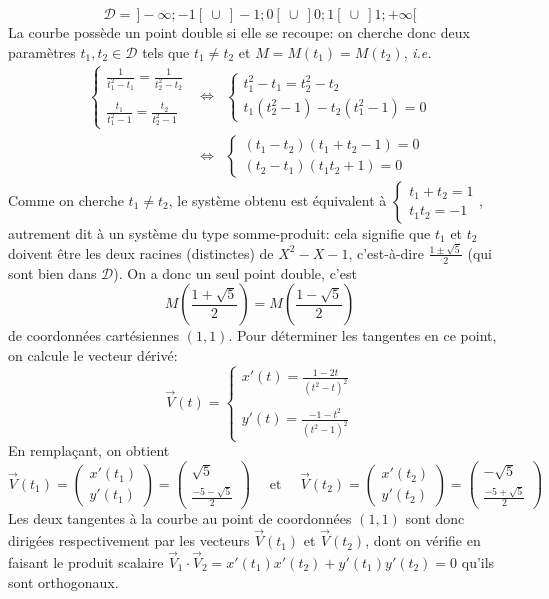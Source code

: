{{$$\mathcal{D}=\,]-\infty;-1[\ \cup\ ]-1;0[\ \cup\ ]0;1[\ \cup\ ]1;+\infty[$$
La courbe possède un point double si elle se recoupe: on cherche donc deux paramètres $t_1,t_2\in\mathcal{D}$ tels que $t_1\not=t_2$ et $M=M(t_1)=M(t_2)$, \textsl{i.e.}
\begin{eqnarray*}
\left\{\begin{array}{l}
\frac{1}{t_1^2-t_1}=\frac{1}{t_2^2-t_2}\\
\ \\
\frac{t_1}{t_1^2-1}=\frac{t_2}{t_2^2-1}
\end{array}\right.
&\Longleftrightarrow&\left\{\begin{array}{l}
t_1^2-t_1=t_2^2-t_2\\
t_1(t_2^2-1)-t_2(t_1^2-1)=0
\end{array}\right.\\
 &\Longleftrightarrow&\left\{\begin{array}{l}
(t_1-t_2)(t_1+t_2-1)=0\\
(t_2-t_1)(t_1t_2+1)=0
\end{array}\right.
\end{eqnarray*}
Comme on cherche $t_1\not=t_2$, le système obtenu est équivalent à 
$\displaystyle\left\{\begin{array}{l}t_1+t_2=1\\t_1t_2=-1\end{array}\right.$, 
autrement dit à un système du type somme-produit: 
cela signifie que $t_1$ et $t_2$ doivent \^etre les deux racines (distinctes) de $X^2-X-1$, 
c'est-à-dire $\frac{1\pm\sqrt{5}}{2}$ (qui sont bien dans $\mathcal{D}$). 
On a donc un seul point double, c'est
$$M\left(\frac{1+\sqrt{5}}{2}\right)=M\left(\frac{1-\sqrt{5}}{2}\right)$$
de coordonnées cartésiennes $(1,1)$. Pour déterminer les tangentes en ce point, on calcule le vecteur dérivé:
$$\vec{V}(t)=\left\{\begin{array}{l}
x'(t)=\frac{1-2t}{(t^2-t)^2}\\
\ \\
y'(t)=\frac{-1-t^2}{(t^2-1)^2}
\end{array}\right.$$
En remplaçant, on obtient 
$$\vec{V}(t_1)=\begin{pmatrix}x'(t_1)\\y'(t_1)\end{pmatrix}
=\begin{pmatrix}\sqrt{5}\\ \frac{-5-\sqrt{5}}{2}\end{pmatrix}\quad\text{ et }
\quad \vec{V}(t_2)=\begin{pmatrix}x'(t_2)\\y'(t_2)\end{pmatrix}
=\begin{pmatrix}-\sqrt{5}\\ \frac{-5+\sqrt{5}}{2}\end{pmatrix}$$
Les deux tangentes à la courbe au point de coordonnées $(1,1)$ sont donc dirigées respectivement par les vecteurs $\vec{V}(t_1)$ et $\vec{V}(t_2)$, dont on vérifie en faisant le produit scalaire $\vec{V}_1\cdot\vec{V}_2=x'(t_1)x'(t_2)+y'(t_1)y'(t_2)=0$ qu'ils sont orthogonaux.

}}
